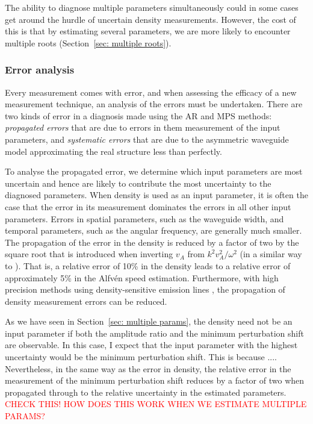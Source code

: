\documentclass[12pt]{../style-files/ociamthesis}
\begin{document}
The ability to diagnose multiple parameters simultaneously could in some cases get around the hurdle of uncertain density measurements. However, the cost of this is that by estimating several parameters, we are more likely to encounter multiple roots (Section~\ref{sec: multiple roots}).


\subsubsection{Error analysis}

Every measurement comes with error, and when assessing the efficacy of a new measurement technique, an analysis of the errors must be undertaken. There are two kinds of error in a diagnosis made using the AR and MPS methods: \textit{propagated errors} that are due to errors in them measurement of the input parameters, and \textit{systematic errors} that are due to the asymmetric waveguide model approximating the real structure less than perfectly.

To analyse the propagated error, we determine which input parameters are most uncertain and hence are likely to contribute the most uncertainty to the diagnosed parameters. When density is used as an input parameter, it is often the case that the error in its measurement dominates the errors in all other input parameters. Errors in spatial parameters, such as the waveguide width, and temporal parameters, such as the angular frequency, are generally much smaller. The propagation of the error in the density is reduced by a factor of two by the square root that is introduced when inverting $v_A$ from $k^2v_A^2/\omega^2$ (in a similar way to \citealt{nak_etal01}). That is, a relative error of 10\% in the density leads to a relative error of approximately 5\% in the Alfv\'{e}n speed estimation. Furthermore, with high precision methods using density-sensitive emission lines \citep{you_etal09}, the propagation of density measurement errors can be reduced.

As we have seen in Section~\ref{sec: multiple params}, the density need not be an input parameter if both the amplitude ratio and the minimum perturbation shift are observable. In this case, I expect that the input parameter with the highest uncertainty would be the minimum perturbation shift. This is because .... Nevertheless, in the same way as the error in density, the relative error in the measurement of the minimum perturbation shift reduces by a factor of two when propagated through to the relative uncertainty in the estimated parameters. \textcolor{red}{CHECK THIS! HOW DOES THIS WORK WHEN WE ESTIMATE MULTIPLE PARAMS?}
\end{document}
